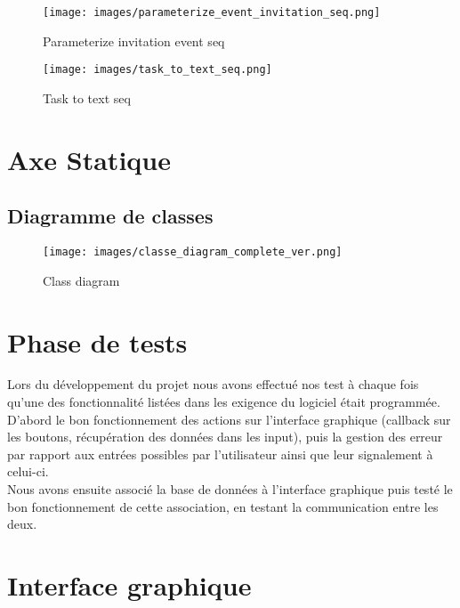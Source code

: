 \documentclass{article}
\begin{document}
\begin{figure}[H]
    \centering
    \texttt{[image: images/parameterize\_event\_invitation\_seq.png]}
    \caption{Parameterize invitation event seq}
    \label{fig:18}
\end{figure}

\begin{figure}[H]
    \centering
    \texttt{[image: images/task\_to\_text\_seq.png]}
    \caption{Task to text seq}
    \label{fig:19}
\end{figure}

\newpage
\section{Axe Statique}
\subsection{Diagramme de classes}

\begin{figure}[H]
    \centering
    \texttt{[image: images/classe\_diagram\_complete\_ver.png]}
    \caption{Class diagram}
    \label{fig:20}
\end{figure}

\newpage

\section{Phase de tests}

Lors du développement du projet nous avons effectué nos test à chaque fois qu'une des fonctionnalité listées dans les exigence du logiciel était programmée.\\
D'abord le bon fonctionnement des actions sur l'interface graphique (callback sur les boutons, récupération des données dans les input), puis la gestion des erreur par rapport aux entrées possibles par l'utilisateur ainsi que leur signalement à celui-ci.\\
Nous avons ensuite associé la base de données à l'interface graphique puis testé le bon fonctionnement de cette association, en testant la communication entre les deux.\\

\section{Interface graphique}
\end{document}
